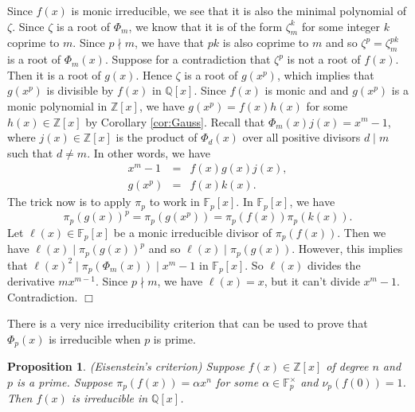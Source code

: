 \documentclass{article}
\def\Z{{\mathbb Z}}
\def\F{{\mathbb F}}
\def\Q{{\mathbb Q}}
\def\Z{{\mathbb Z}}
\def\F{{\mathbb F}}
\def\Q{{\mathbb Q}}
\newtheorem{proposition}[subsection]{Proposition}
\newenvironment{proof}{\noindent {\bf Proof:}}{$\Box$ \vspace{2 ex}}
\newcommand{\alert}[1]{{\color{red} #1}}
\begin{document}
\vspace{5pt}
\begin{proof}
    Since $f(x)$ is monic irreducible, we see that it is also the minimal polynomial of $\zeta$. Since $\zeta$ is a root of $\Phi_m$, we know that it is of the form $\zeta_m^k$ for some integer $k$ coprime to $m$. Since $p\nmid m$, we have that $pk$ is also coprime to $m$ and so $\zeta^p = \zeta_m^{pk}$ is a root of $\Phi_m(x)$. Suppose for a contradiction that $\zeta^p$ is not a root of $f(x)$. Then it is a root of $g(x)$. Hence $\zeta$ is a root of $g(x^p)$, which implies that $g(x^p)$ is divisible by $f(x)$ in $\Q[x]$. Since $f(x)$ is monic and and $g(x^p)$ is a monic polynomial in $\Z[x]$, we have $g(x^p) = f(x)h(x)$ for some $h(x)\in\Z[x]$ by Corollary \ref{cor:Gauss}. Recall that $\Phi_m(x)j(x) = x^m - 1$, where $j(x)\in \Z[x]$ is the product of $\Phi_d(x)$ over all positive divisors $d\mid m$ such that $d\neq m$. In other words, we have
    \begin{eqnarray*}
        x^m - 1 &=& f(x)g(x)j(x),\\
        g(x^p) &=& f(x)k(x).
    \end{eqnarray*}
    The trick now is to apply $\pi_p$ to work in $\F_p[x]$. In $\F_p[x]$, we have
    $$\pi_p(g(x))^p = \pi_p(g(x^p)) = \pi_p(f(x))\pi_p(k(x)).$$
    Let $\ell(x)\in\F_p[x]$ be a monic irreducible divisor of $\pi_p(f(x))$. Then we have $\ell(x)\mid \pi_p(g(x))^p$ and so $\ell(x)\mid \pi_p(g(x))$. %
    However, this implies that $\ell(x)^2\mid \pi_p(\Phi_m(x))\mid x^m - 1$ in $\F_p[x]$. So $\ell(x)$ divides the derivative $mx^{m-1}$. Since $p\nmid m$, we have $\ell(x) = x$, but it can't divide $x^m - 1$. Contradiction.
\end{proof}



There is a very nice irreducibility criterion that can be used to prove that $\Phi_p(x)$ is irreducible when $p$ is prime.

\begin{proposition}
    (Eisenstein's criterion) Suppose $f(x)\in\Z[x]$ of degree $n$ and $p$ is a prime. Suppose $\pi_p(f(x)) = \alpha x^n$ for some $\alpha\in\F_p^\times$ and $\nu_p(f(0)) = 1$. Then $f(x)$ is irreducible in $\Q[x]$.
\end{proposition}
\end{document}
